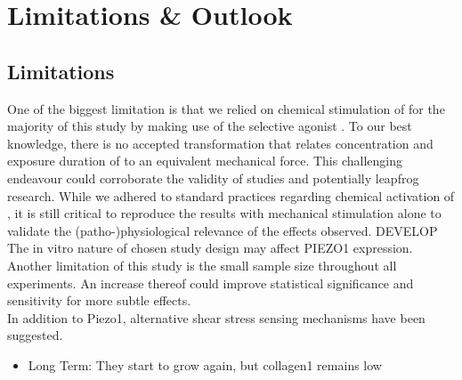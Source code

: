 \chapter{Limitations \& Outlook}

\section{Limitations}
One of the biggest limitation is that we relied on chemical stimulation of \Piezo{} for the majority of this study by making use of the selective \Piezo{} agonist \Yoda{}. To our best knowledge, there is no accepted transformation that relates concentration and exposure duration of \Yoda{} to an equivalent mechanical force. This challenging endeavour could corroborate the validity of \Yoda{} studies and potentially leapfrog \Piezo{} research. While we adhered to standard practices regarding chemical activation of \Piezo{}\cite{Morley2018}, it is still critical to reproduce the results with mechanical stimulation alone to validate the (patho-)physiological relevance of the effects observed. DEVELOP The in vitro nature of chosen study design may affect PIEZO1 expression. 
Another limitation of this study is the small sample size throughout all experiments. An increase thereof could improve statistical significance and sensitivity for more subtle effects.\\




In addition to Piezo1, alternative shear stress sensing mechanisms have been suggested.


\begin{itemize}
    \item Long Term: They start to grow again, but collagen1 remains low

\end{itemize}


